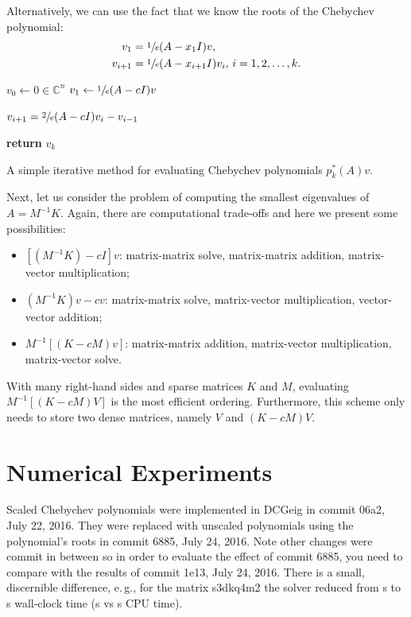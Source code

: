 \documentclass[%
	paper=a4,
	fontsize=10pt,
	DIV11,BCOR10mm,
	numbers=noenddot,
	abstract=yes
]{scrartcl}
\newcommand{\F}{\mathbb{C}}
\theoremstyle{definition}
\begin{document}
Alternatively, we can use the fact that we know the roots of the Chebychev
polynomial:
\begin{align*}
	v_1 &= \sfrac{1}{e} (A - x_1 I) v, \\
	v_{i+1} &= \sfrac{1}{e} (A - x_{i+1} I) v_i, \, i = 1, 2, \dotsc, k.
\end{align*}

\begin{algorithm}
	\begin{algorithmic}
			\State $v_0 \gets 0 \in \F^n$
			\State $v_1 \gets \sfrac{1}{e} (A - cI) v$

			\Statex
				\State $v_{i+1} = \sfrac{2}{e} (A - cI) v_i - v_{i-1}$
			\EndFor

			\Statex
			\State \textbf{return} $v_k$
		\EndFunction
	\end{algorithmic}
	\caption{A simple iterative method for evaluating Chebychev polynomials
	$p_k^*(A) v$.}
	\label{algo:evaluate-polynomial}
\end{algorithm}

Next, let us consider the problem of computing the smallest eigenvalues of $A =
M^{-1} K$. Again, there are computational trade-offs and here we present some
possibilities:
\begin{itemize}
	\item $[(M^{-1} K) - cI] v$: matrix-matrix solve, matrix-matrix addition,
		matrix-vector multiplication;
	\item $(M^{-1} K)v - cv$: matrix-matrix solve, matrix-vector multiplication,
		vector-vector addition;
	\item $M^{-1} [(K - c M) v]$: matrix-matrix addition, matrix-vector
		multiplication, matrix-vector solve.
\end{itemize}
With many right-hand sides and sparse matrices $K$ and $M$, evaluating $M^{-1}
[(K - cM) V]$ is the most efficient ordering. Furthermore, this scheme only
needs to store two dense matrices, namely $V$ and $(K - cM) V$.



\section{Numerical Experiments}

Scaled Chebychev polynomials were implemented in DCGeig in commit 06a2, July 22,
2016. They were replaced with unscaled polynomials using the polynomial's roots
in commit 6885, July 24, 2016. Note other changes were commit in between so in
order to evaluate the effect of commit 6885, you need to compare with the
results of commit 1e13, July 24, 2016. There is a small, discernible
difference, e.\,g., for the matrix s3dkq4m2 the solver reduced from
\unit[5471]{s} to \unit[5441]{s} wall-clock time (\unit[9951]{s} vs
\unit[9909]{s} CPU time).



\printbibliography
\end{document}
